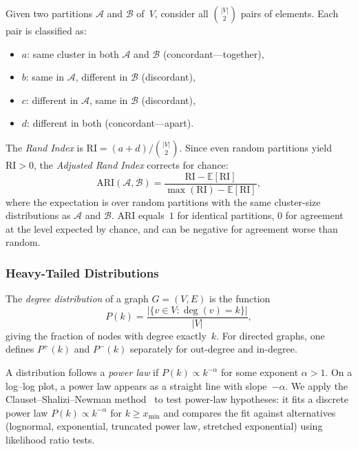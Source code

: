 \begin{definition}
\label{def:ari}
Given two partitions $\mathcal{A}$ and $\mathcal{B}$ of~$V$, consider all $\binom{|V|}{2}$ pairs of elements. Each pair is classified as:
\begin{itemize}
\item $a$: same cluster in both $\mathcal{A}$ and $\mathcal{B}$ (concordant---together),
\item $b$: same in $\mathcal{A}$, different in $\mathcal{B}$ (discordant),
\item $c$: different in $\mathcal{A}$, same in $\mathcal{B}$ (discordant),
\item $d$: different in both (concordant---apart).
\end{itemize}
The \emph{Rand Index} is $\mathrm{RI} = (a + d) / \binom{|V|}{2}$. Since even random partitions yield $\mathrm{RI} > 0$, the \emph{Adjusted Rand Index} corrects for chance:
\[
  \mathrm{ARI}(\mathcal{A}, \mathcal{B}) = \frac{\mathrm{RI} - \mathbb{E}[\mathrm{RI}]}{\max(\mathrm{RI}) - \mathbb{E}[\mathrm{RI}]},
\]
where the expectation is over random partitions with the same cluster-size distributions as $\mathcal{A}$ and $\mathcal{B}$. ARI equals~$1$ for identical partitions, $0$ for agreement at the level expected by chance, and can be negative for agreement worse than random.
\end{definition}

\subsubsection{Heavy-Tailed Distributions}
\label{sec:prelim-powerlaw}

\begin{definition}
\label{def:degree-distribution}
The \emph{degree distribution} of a graph $G = (V, E)$ is the function
\[
  P(k) = \frac{|\{v \in V : \deg(v) = k\}|}{|V|},
\]
giving the fraction of nodes with degree exactly~$k$. For directed graphs, one defines $P^{+}(k)$ and $P^{-}(k)$ separately for out-degree and in-degree.
\end{definition}

A distribution follows a \emph{power law} if $P(k) \propto k^{-\alpha}$ for some exponent $\alpha > 1$. On a log--log plot, a power law appears as a straight line with slope~$-\alpha$. We apply the Clauset--Shalizi--Newman method~\cite{clauset2009} to test power-law hypotheses: it fits a discrete power law $P(k) \propto k^{-\alpha}$ for $k \ge x_{\min}$ and compares the fit against alternatives (lognormal, exponential, truncated power law, stretched exponential) using likelihood ratio tests.
